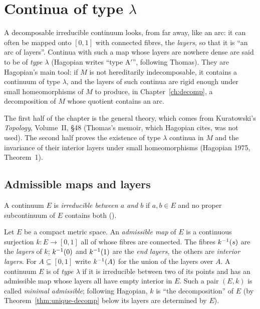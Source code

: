 \chapter{Continua of type \texorpdfstring{$\lambda$}{lambda}}\label{ch:typelambda}

A decomposable irreducible continuum looks, from far away, like an arc: it can often be mapped onto
$[0,1]$ with connected fibres, the \emph{layers}, so that it is ``an arc of layers''. Continua with such
a map whose layers are nowhere dense are said to be of \emph{type $\lambda$} (Hagopian writes ``type
A$'$'', following Thomas). They are Hagopian's main tool: if $M$ is not hereditarily indecomposable,
it contains a continuum of type $\lambda$, and the layers of such continua are rigid enough under small
homeomorphisms of $M$ to produce, in Chapter~\ref{ch:decomp}, a decomposition of $M$ whose quotient
contains an arc.

The first half of the chapter is the general theory, which comes from Kuratowski's \emph{Topology},
Volume~II, \S48 (Thomas's memoir, which Hagopian cites, was not used). The second half proves the
existence of type $\lambda$ continua in $M$ and the invariance of their interior layers under small
homeomorphisms (Hagopian 1975, Theorem~1).

\section{Admissible maps and layers}

A continuum $E$ is \emph{irreducible between $a$ and $b$} if $a,b\in E$ and no proper subcontinuum of $E$
contains both ().


\begin{definition}\label{def:admissible}
Let $E$ be a compact metric space. An \emph{admissible map} of $E$ is a continuous surjection
$k\colon E\to[0,1]$ all of whose fibres are connected. The fibres $k^{-1}(s)$ are the \emph{layers} of $k$;
$k^{-1}(0)$ and $k^{-1}(1)$ are the \emph{end layers}, the others are \emph{interior layers}. For $A\subseteq[0,1]$
write $k^{-1}(A)$ for the union of the layers over $A$. A continuum $E$ is of \emph{type $\lambda$} if it is
irreducible between two of its points and has an admissible map whose layers all have empty interior in
$E$. Such a pair $(E,k)$ is called \emph{minimal admissible}; following Hagopian, $k$ is ``the
decomposition'' of $E$ (by Theorem~\ref{thm:unique-decomp} below its layers are determined by $E$).
\end{definition}


